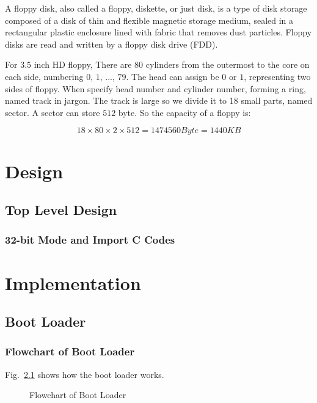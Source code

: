 \documentclass{swfcthesis}
\begin{document}
A floppy disk, also called a floppy, diskette, or just disk, is a type of disk storage
composed of a disk of thin and flexible magnetic storage medium, sealed in a rectangular
plastic enclosure lined with fabric that removes dust particles. Floppy disks are read and
written by a floppy disk drive (FDD).

For $3.5$ inch HD floppy,  There are $80$ cylinders from the outermost to
the core on each side, numbering $0$, $1$, ..., $79$. The head can assign be $0$ or $1$,
representing two sides of floppy. When specify head number and cylinder number, forming a
ring, named track in jargon. The track is large so we divide it to 18 small parts, named
sector. A sector can store $512$ byte. So the capacity of a floppy is:

$$18 \times 80 \times 2 \times 512 = 1474560 Byte = 1440 KB$$


\chapter{Design}

\section{Top Level Design}
\label{sec:top-level-design}



\subsection{32-bit Mode and Import C Codes}
\label{sec:32-bit-mode}


\chapter{Implementation}

\section{Boot Loader}

\subsection{Flowchart of Boot Loader}
\label{sec:flowch-boot-load}

Fig.~\ref{fig:flowchart-of-boot-loader} shows how the boot loader works.
\begin{figure}[!ht]
  \centering
  \caption{Flowchart of Boot Loader}
  \label{fig:flowchart-of-boot-loader}
\end{figure}
\end{document}

